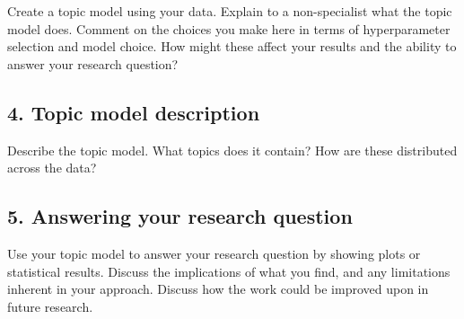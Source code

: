 \documentclass[
]{article}
\begin{document}
Create a topic model using your data. Explain to a non-specialist what
the topic model does. Comment on the choices you make here in terms of
hyperparameter selection and model choice. How might these affect your
results and the ability to answer your research question?

\hypertarget{topic-model-description}{%
\subsection{4. Topic model description}\label{topic-model-description}}

Describe the topic model. What topics does it contain? How are these
distributed across the data?

\hypertarget{answering-your-research-question}{%
\subsection{5. Answering your research
question}\label{answering-your-research-question}}

Use your topic model to answer your research question by showing plots
or statistical results. Discuss the implications of what you find, and
any limitations inherent in your approach. Discuss how the work could be
improved upon in future research.

  
\end{document}
